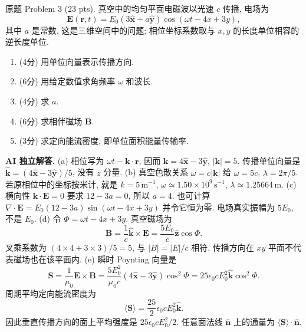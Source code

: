 \begin{exercise}\label{exam:actual2.3}
原题 Problem 3 (23 pts). 真空中的均匀平面电磁波以光速 $c$ 传播, 电场为
\[
\mathbf E(\mathbf r,t)=E_0(3\hat{\mathbf x}+a\hat{\mathbf y})\cos(\omega t-4x+3y),
\]
其中 $a$ 是常数, 这是三维空间中的问题; 相位坐标系数取与 $x,y$ 的长度单位相容的逆长度单位.
\begin{enumerate}[label=\alph*.]
\item (4分) 用单位向量表示传播方向.
\item (6分) 用给定数值求角频率 $\omega$ 和波长.
\item (4分) 求 $a$.
\item (6分) 求相伴磁场 $\mathbf B$.
\item (3分) 求定向能流密度, 即单位面积能量传输率.
\end{enumerate}
\end{exercise}
\begin{solution}
\textbf{AI 独立解答.}
(a) 相位写为 $\omega t-\mathbf k\cdot\mathbf r$, 因而 $\mathbf k=4\hat{\mathbf x}-3\hat{\mathbf y}$, $|\mathbf k|=5$. 传播单位向量是
$\hat{\mathbf k}=(4\hat{\mathbf x}-3\hat{\mathbf y})/5$, 没有 $z$ 分量.
(b) 真空色散关系 $\omega=c|\mathbf k|$ 给 $\omega=5c$, $\lambda=2\pi/5$. 若原相位中的坐标按米计, 就是 $k=5\,\mathrm{m^{-1}}$, $\omega\simeq1.50\times10^9\,\mathrm{s^{-1}}$, $\lambda\simeq1.25664\,\mathrm m$.
(c) 横向性 $\mathbf k\cdot\mathbf E=0$ 要求 $12-3a=0$, 所以 $a=4$. 也可计算 $\nabla\cdot\mathbf E=E_0(12-3a)\sin(\omega t-4x+3y)$ 并令它恒为零. 电场真实振幅为 $5E_0$, 不是 $E_0$.
(d) 令 $\Phi=\omega t-4x+3y$. 真空磁场为
\[
\mathbf B=\frac1c\hat{\mathbf k}\times\mathbf E
=\frac{5E_0}{c}\hat{\mathbf z}\cos\Phi.
\]
叉乘系数为 $(4\times4+3\times3)/5=5$, 与 $|B|=|E|/c$ 相符. 传播方向在 $xy$ 平面不代表磁场也在该平面内.
(e) 瞬时 Poynting 向量是
\[
\mathbf S=\frac1{\mu_0}\mathbf E\times\mathbf B
=\frac{5E_0^2}{\mu_0c}(4\hat{\mathbf x}-3\hat{\mathbf y})\cos^2\Phi
=25\epsilon_0cE_0^2\hat{\mathbf k}\cos^2\Phi.
\]
周期平均定向能流密度为
\[
\boxed{\langle\mathbf S\rangle=\frac{25}{2}\epsilon_0cE_0^2\hat{\mathbf k}}.
\]
因此垂直传播方向的面上平均强度是 $25\epsilon_0cE_0^2/2$. 任意面法线 $\hat{\mathbf n}$ 上的通量为 $\langle\mathbf S\rangle\cdot\hat{\mathbf n}$.
\end{solution}

